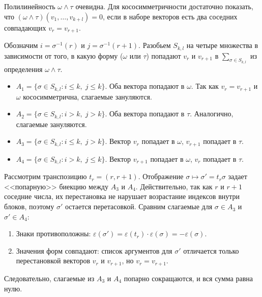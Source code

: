 \begin{myproof}
	Полилинейность $\omega \wedge \tau$ очевидна. Для кососимметричности достаточно показать, что $(\omega \wedge \tau)(v_1, \dotsc, v_{k+l}) = 0$, если в наборе векторов есть два соседних совпадающих $v_r = v_{r+1}$.
	
	\vspace{5pt}
	Обозначим $i = \sigma^{-1}(r)$ и $j = \sigma^{-1}(r+1)$.
	Разобьем $S_{k, l}$ на четыре множества в зависимости от того, в какую форму ($\omega$ или $\tau$) попадают $v_r$ и $v_{r+1}$ в $\sum_{\sigma \in S_{k,l}}$ из определения $\omega \wedge \tau$.
	\begin{itemize}[itemsep = 0pt, topsep = 5pt]
		\item $A_1 = \{\sigma \in S_{k, l} : i \le k, \; j  \le k\}$. Оба вектора попадают в $\omega$. Так как $v_r = v_{r+1}$ и $\omega$ кососимметрична, слагаемые зануляются.
		\item $A_2 = \{\sigma \in S_{k, l} : i > k, \;  j  > k\}$. Оба вектора попадают в $\tau$. Аналогично, слагаемые зануляются.
		\item $A_3 = \{\sigma \in S_{k, l} : i \le k, \;  j  > k\}$. Вектор $v_r$ попадает в $\omega$, $v_{r+1}$ попадает в $\tau$.
		\item $A_4 = \{\sigma \in S_{k, l} : i > k, \;  j  \le k\}$. Вектор $v_{r+1}$ попадает в $\omega$, $v_r$ попадает в $\tau$.
	\end{itemize}
	
	Рассмотрим транспозицию $t_r = (r, r+1)$. Отображение $\sigma \mapsto \sigma' = t_r  \sigma$ задает <<попарную>> биекцию между $A_3$ и $A_4$. Действительно, так как $r$ и $r+1$ соседние числа, их перестановка не нарушает возрастание индексов внутри блоков, поэтому $\sigma'$ остается перетасовкой. %
	Сравним слагаемые для $\sigma \in A_3$ и $\sigma' \in A_4$:
	\begin{enumerate}[itemsep = 0pt, topsep = 5pt]
		\item Знаки противоположны: $\varepsilon(\sigma') = \varepsilon(t_r) \cdot \varepsilon(\sigma) = -\varepsilon(\sigma)$.
		\item Значения форм совпадают: список аргументов для $\sigma'$ отличается только перестановкой векторов $v_r$ и $v_{r+1}$, но $v_r = v_{r+1}$.
	\end{enumerate}
	Следовательно, слагаемые из $A_3$ и $A_4$ попарно сокращаются, и вся сумма равна нулю.
\end{myproof}

